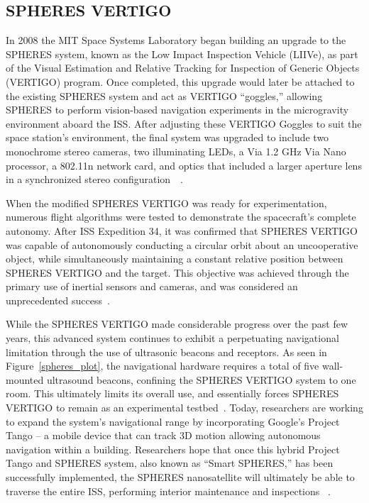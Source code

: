 \documentclass[journal, 10pt]{IEEEtran}
\begin{document}
\subsection{SPHERES VERTIGO}
In 2008 the MIT Space Systems Laboratory began building an upgrade to the SPHERES system, known as the Low Impact Inspection Vehicle (LIIVe), as part of the Visual Estimation and Relative Tracking for Inspection of Generic Objects (VERTIGO) program. Once completed, this upgrade would later be attached to the existing SPHERES system and act as VERTIGO ``goggles,'' allowing SPHERES to perform vision-based navigation experiments in the microgravity environment aboard the ISS. After adjusting these VERTIGO Goggles to suit the space station's environment, the final system was upgraded to include two monochrome stereo cameras, two illuminating LEDs, a Via 1.2 GHz Via Nano processor, a 802.11n network card, and optics that included a larger aperture lens in a synchronized stereo configuration~~\cite{SPHERES, Vertigo 1, Vertigo2, Vertigo3}.

When the modified SPHERES VERTIGO was ready for experimentation, numerous flight algorithms were tested to demonstrate the spacecraft's complete autonomy. After ISS Expedition 34, it was confirmed that SPHERES VERTIGO was capable of autonomously conducting a circular orbit about an uncooperative object, while simultaneously maintaining a constant relative position between SPHERES VERTIGO and the target. This objective was achieved through the primary use of inertial sensors and cameras, and was considered an unprecedented success~\cite{Vertigo2, Vertigo3}.

While the SPHERES VERTIGO made considerable progress over the past few years, this advanced system continues to exhibit a perpetuating navigational limitation through the use of ultrasonic beacons and receptors.  As seen in Figure~\ref{spheres_plot}, the navigational hardware requires a total of five wall-mounted ultrasound beacons, confining the SPHERES VERTIGO system to one room. This ultimately  limits its overall use, and essentially forces SPHERES VERTIGO to remain as an experimental testbed~\cite{SPHERES, Vertigo 1, Vertigo2, Vertigo3}. Today, researchers are working to expand the system's navigational range by incorporating Google's Project Tango -- a mobile device that can track 3D motion allowing autonomous navigation within a building. Researchers hope that once this hybrid Project Tango and SPHERES system, also known as ``Smart SPHERES,'' has been successfully implemented, the SPHERES nanosatellite will ultimately be able to traverse the entire ISS, performing interior maintenance and inspections ~\cite{Tango}.
\end{document}
